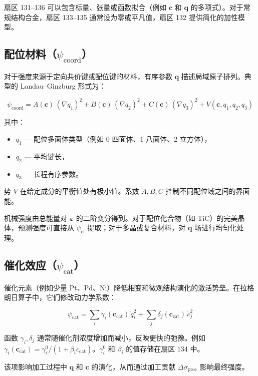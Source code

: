 \documentclass[12pt,a4paper]{article}
\begin{document}
	扇区 131–136 可以包含标量、张量或函数拟合（例如 \(\mathbf{c}\) 和 \(\mathbf{q}\) 的多项式）。对于常规结构合金，扇区 133–135 通常设为零或平凡值，扇区 132 提供简化的加性模型。
	
	\subsection{配位材料（\(\psi_{\mathrm{coord}}\)）}
	\label{subsec:coordination}
	
	对于强度来源于定向共价键或配位键的材料，有序参数 \(\mathbf{q}\) 描述局域原子排列。典型的 Landau–Ginzburg 形式为：
	
	\[
	\psi_{\mathrm{coord}} = A(\mathbf{c})\,(\nabla q_1)^2 + B(\mathbf{c})\,(\nabla q_2)^2 + C(\mathbf{c})\,(\nabla q_3)^2 + V(\mathbf{c}, q_1, q_2, q_3)
	\]
	
	其中：
	\begin{itemize}
		\item \(q_1\) — 配位多面体类型（例如 0 四面体、1 八面体、2 立方体），
		\item \(q_2\) — 平均键长，
		\item \(q_3\) — 长程有序参数。
	\end{itemize}
	
	势 \(V\) 在给定成分的平衡值处有极小值。系数 \(A,B,C\) 控制不同配位域之间的界面能。
	
	机械强度由总能量对 \(\boldsymbol{\varepsilon}\) 的二阶变分得到。对于配位化合物（如 TiC）的完美晶体，预测强度可直接从 \(\psi_{\mathrm{el}}\) 提取；对于多晶或复合材料，对 \(\mathbf{q}\) 场进行均匀化处理。
	
	\subsection{催化效应（\(\psi_{\mathrm{cat}}\)）}
	\label{subsec:catalysis}
	
	催化元素（例如少量 Pt、Pd、Ni）降低相变和微观结构演化的激活势垒。在拉格朗日算子中，它们修改动力学系数：
	
	\[
	\psi_{\mathrm{cat}} = \sum_i \gamma_i(\mathbf{c}_{\mathrm{cat}})\, \dot{q}_i^2 + \sum_j \delta_j(\mathbf{c}_{\mathrm{cat}})\, \dot{c}_j^2
	\]
	
	函数 \(\gamma_i, \delta_j\) 通常随催化剂浓度增加而减小，反映更快的弛豫。例如 \(\gamma_i(\mathbf{c}_{\mathrm{cat}}) = \gamma_i^0 / (1 + \beta_i c_{\mathrm{cat}})\)。\(\gamma_i^0\) 和 \(\beta_i\) 的值存储在扇区 134 中。
	
	该项影响加工过程中 \(\mathbf{q}\) 和 \(\mathbf{c}\) 的演化，从而通过加工贡献 \(\Delta\sigma_{\mathrm{proc}}\) 影响最终强度。
	
\end{document}
